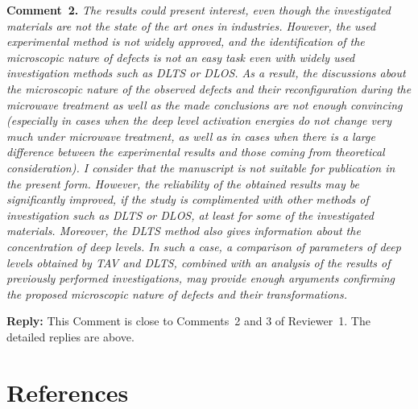 \documentclass[10pt]{iopart}
\begin{document}
\vspace{1cm}
\noindent
\textcolor[rgb]{0.00,0.50,1.00}{\textbf{Comment~2.}}
\emph{The results could present interest, even though the investigated materials are not the state of the art ones in industries.
However, the used experimental method is not widely approved,
and the identification of the microscopic nature of defects is not an easy
task even with widely used investigation methods such as DLTS or DLOS.
As a result, the discussions about the microscopic nature of the observed defects
and their reconfiguration during the microwave treatment
as well as the made conclusions are not enough convincing
(especially in cases when the deep level activation
energies do not change very much under microwave treatment,
as well as in cases when there is a large difference
between the experimental results and those coming from theoretical consideration).
I consider that the manuscript is not suitable for publication in the present form.
However, the reliability of the obtained results may be significantly improved,
if the study is complimented with other methods of investigation such as DLTS or DLOS,
at least for some of the investigated materials.
Moreover, the DLTS method also gives information about the concentration of deep levels.
In such a case, a comparison of parameters of deep levels obtained by TAV and DLTS,
combined with an analysis of the results of previously performed investigations,
may provide enough arguments confirming the
proposed microscopic nature of defects and their transformations.}

\noindent
\textcolor[rgb]{0.51,0.00,0.00}{\textbf{Reply:}}
This Comment is close to Comments~2 and 3 of Reviewer~1.
The detailed replies are above.


\section*{References}



\end{document}
